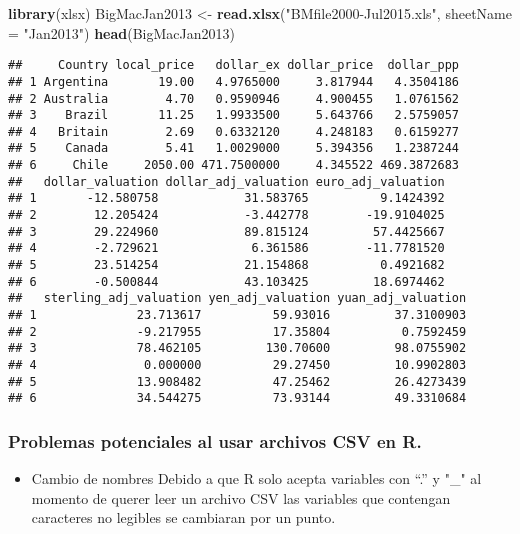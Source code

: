 \documentclass[]{article}
\newenvironment{Shaded}{\begin{snugshade}}{\end{snugshade}}
\newcommand{\DataTypeTok}[1]{\textcolor[rgb]{0.13,0.29,0.53}{#1}}
\newcommand{\KeywordTok}[1]{\textcolor[rgb]{0.13,0.29,0.53}{\textbf{#1}}}
\newcommand{\NormalTok}[1]{#1}
\newcommand{\StringTok}[1]{\textcolor[rgb]{0.31,0.60,0.02}{#1}}
\providecommand{\tightlist}{%
  \setlength{\itemsep}{0pt}\setlength{\parskip}{0pt}}
\begin{document}
\begin{Shaded}
\begin{Highlighting}[]
\KeywordTok{library}\NormalTok{(xlsx)}
\NormalTok{BigMacJan2013 <-}\StringTok{ }\KeywordTok{read.xlsx}\NormalTok{(}\StringTok{"BMfile2000-Jul2015.xls"}\NormalTok{, }\DataTypeTok{sheetName =} \StringTok{"Jan2013"}\NormalTok{)}
\KeywordTok{head}\NormalTok{(BigMacJan2013)}
\end{Highlighting}
\end{Shaded}

\begin{verbatim}
##     Country local_price   dollar_ex dollar_price  dollar_ppp
## 1 Argentina       19.00   4.9765000     3.817944   4.3504186
## 2 Australia        4.70   0.9590946     4.900455   1.0761562
## 3    Brazil       11.25   1.9933500     5.643766   2.5759057
## 4   Britain        2.69   0.6332120     4.248183   0.6159277
## 5    Canada        5.41   1.0029000     5.394356   1.2387244
## 6     Chile     2050.00 471.7500000     4.345522 469.3872683
##   dollar_valuation dollar_adj_valuation euro_adj_valuation
## 1       -12.580758            31.583765          9.1424392
## 2        12.205424            -3.442778        -19.9104025
## 3        29.224960            89.815124         57.4425667
## 4        -2.729621             6.361586        -11.7781520
## 5        23.514254            21.154868          0.4921682
## 6        -0.500844            43.103425         18.6974462
##   sterling_adj_valuation yen_adj_valuation yuan_adj_valuation
## 1              23.713617          59.93016         37.3100903
## 2              -9.217955          17.35804          0.7592459
## 3              78.462105         130.70600         98.0755902
## 4               0.000000          29.27450         10.9902803
## 5              13.908482          47.25462         26.4273439
## 6              34.544275          73.93144         49.3310684
\end{verbatim}

\hypertarget{problemas-potenciales-al-usar-archivos-csv-en-r.}{%
\subsubsection{Problemas potenciales al usar archivos CSV en
R.}\label{problemas-potenciales-al-usar-archivos-csv-en-r.}}

\begin{itemize}
\tightlist
\item
  Cambio de nombres Debido a que R solo acepta variables con ``.'' y
  "\_" al momento de querer leer un archivo CSV las variables que
  contengan caracteres no legibles se cambiaran por un punto.
\end{itemize}
\end{document}
